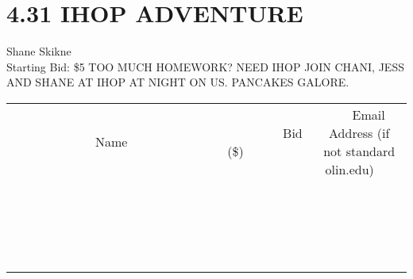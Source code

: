 \documentclass[11pt]{article}
\begin{document}
\section*{4.31 IHOP ADVENTURE}
Shane Skikne
\\
Starting Bid: \$5
\newline
TOO MUCH HOMEWORK? NEED IHOP JOIN CHANI, JESS AND SHANE AT IHOP AT NIGHT ON US. PANCAKES GALORE.
\\[3ex]
\begin{tabular}{c c c}
~~~~~~~~~~~~~Name~~~~~~~~~~~~~ & ~~~~~~~~~Bid (\$)~~~~~~~~~  & ~~~Email Address (if not standard olin.edu)~~~\\
 & & \\
\hline
 & & \\
\hline
 & & \\
\hline
 & & \\
\hline
 & & \\
\hline
 & & \\
\hline
 & & \\
\hline
 & & \\
\hline
 & & \\
\hline
 & & \\
\hline
 & & \\
\hline
 & & \\
\hline
 & & \\
\hline
 & & \\
\hline
 & & \\
\hline
 & & \\
\hline
 & & \\
\hline
 & & \\
\hline
 & & \\
\hline
\end{tabular}
\newpage
\end{document}
